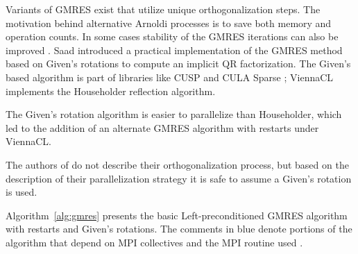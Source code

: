 Variants of GMRES exist that utilize unique orthogonalization steps. The motivation behind alternative Arnoldi processes is to save both memory and operation counts. In some cases stability of the GMRES iterations can also be improved \cite{FindRef}. Saad \cite{Saad1986} introduced a practical implementation of the GMRES method based on Given's rotations to compute an implicit QR factorization. The Given's based algorithm is part of libraries like CUSP \cite{Cusp2010} and CULA Sparse \cite{CULASparse}; ViennaCL implements the Householder reflection algorithm. 

The Given's rotation algorithm is easier to parallelize than Householder, which led to the addition of an alternate GMRES algorithm with restarts under ViennaCL. 

The authors of \cite{Bahi2011} do not describe their orthogonalization process, but based on the description of their parallelization strategy it is safe to assume a Given's rotation is used.

Algorithm~\ref{alg:gmres} presents the basic Left-preconditioned GMRES algorithm with restarts and Given's rotations. The comments in blue denote portions of the algorithm that depend on MPI collectives and the MPI routine used . 






